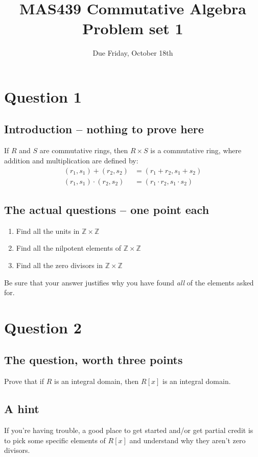 \documentclass{amsart}[12pt]
\title{MAS439 Commutative Algebra \\ Problem set 1}
\author{Due Friday, October 18th}
\begin{document}
\maketitle
\section*{Question 1}
\subsection*{Introduction -- nothing to prove here}
If $R$ and $S$ are commutative rings, then $R\times S$ is a commutative ring, where addition and multiplication are defined by:
\begin{align*}
  (r_1,s_1)+(r_2,s_2)&=(r_1+r_2,s_1+s_2) \\
  (r_1,s_1)\cdot(r_2,s_2)&=(r_1\cdot r_2,s_1\cdot s_2)
\end{align*}

\subsection*{The actual questions -- one point each}
\begin{enumerate}

  \item  Find all the units in $\mathbb{Z}\times\mathbb{Z}$
\item Find all the nilpotent elements of $\mathbb{Z}\times\mathbb{Z}$
\item  Find all the zero divisors in $\mathbb{Z}\times\mathbb{Z}$
\end{enumerate}

Be sure that your answer justifies why you have found \emph{all} of the elements asked for.
  
\section*{Question 2}
\subsection*{The question, worth three points}
Prove that if $R$ is an integral domain, then $R[x]$ is an integral domain.

\subsection*{A hint}
If you're having trouble, a good place to get started and/or get partial credit is to pick some specific elements of $R[x]$ and understand why they aren't zero divisors.
\end{document}
